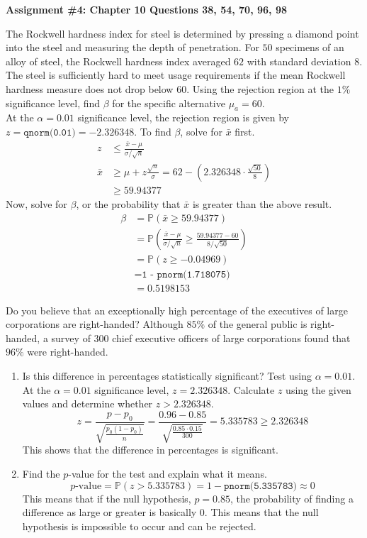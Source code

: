 \documentclass[12pt]{article}
\newcommand{\ques}[1]{\noindent {\bf Question #1: }}
\begin{document}
\begin{center} \textbf{Assignment \#4: Chapter 10 Questions 38, 54, 70, 96, 98} \end{center}

\ques{10.38} The Rockwell hardness index for steel is determined by pressing a diamond point into the steel and measuring the depth of penetration. For $50$ specimens of an alloy of steel, the Rockwell hardness index averaged $62$ with standard deviation $8$. The steel is sufficiently hard to meet usage requirements if the mean Rockwell hardness measure does not drop below $60$. Using the rejection region at the $1\%$ significance level, find $\beta$ for the specific alternative $\mu_a = 60$. \\
At the $\alpha = 0.01$ significance level, the rejection region is given by $ z = \texttt{qnorm(0.01)} = -2.326348  $. To find $\beta$, solve for $\bar{x}$ first. $$ \begin{aligned} z &\leq \frac{\bar{x} - \mu}{\sigma / \sqrt{n}} \\ \bar{x} &\geq \mu + z \frac{\sqrt{n}}{\sigma} = 62 - \left(2.326348 \cdot \frac{ \sqrt{50}}{8}\right) \\ &\geq 59.94377 \end{aligned} $$ 
Now, solve for $\beta$, or the probability that $\bar{x}$ is greater than the above result. $$ \begin{aligned} \beta &= \mathbb{P}(\bar{x} \geq 59.94377) \\ &= \mathbb{P}\left( \frac{\bar{x} - \mu}{\sigma / \sqrt{n}} \geq \frac{59.94377 - 60}{8 / \sqrt{50}} \right) \\ &= \mathbb{P}(z \geq -0.04969) \\ &= \texttt{1 - pnorm(1.718075)} \\ &= 0.5198153 \end{aligned} $$ 

\ques{10.54} Do you believe that an exceptionally high percentage of the executives of large corporations are right-handed? Although $85\%$ of the general public is right-handed, a survey of $300$ chief executive officers of large corporations found that $96\%$ were right-handed.
\begin{enumerate}
\item Is this difference in percentages statistically significant? Test using $\alpha = 0.01$. \\
At the $\alpha = 0.01$ significance level, $z = 2.326348$. Calculate $z$ using the given values and determine whether $z > 2.326348$. $$ z = \frac{p - p_0}{\sqrt{\frac{p_0(1-p_0)}{n}}} = \frac{0.96 - 0.85}{\sqrt{\frac{0.85 \cdot 0.15}{300}}} = 5.335783 \geq 2.326348 $$ 
This shows that the difference in percentages is significant. 

\item Find the $p$-value for the test and explain what it means. 
$$ p\text{-value} = \mathbb{P}(z > 5.335783) = 1 - \texttt{pnorm(5.335783)} \approx 0 $$ 
This means that if the null hypothesis, $p = 0.85$, the probability of finding a difference as large or greater is basically $0$. This means that the null hypothesis is impossible to occur and can be rejected. 
\end{enumerate}
\end{document}
